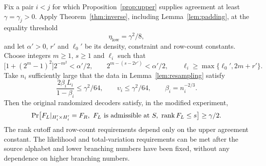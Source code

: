 \begin{proposition}\label{prop:low-rank}
Fix a pair $i<j$ for which Proposition~\ref{prop:upper} supplies
agreement at least $\gamma=\gamma_j>0$.  Apply
Theorem~\ref{thm:inverse}, including Lemma~\ref{lem:padding}, at the
equality threshold
\[
 \eta_{\mathrm{low}}=\gamma^2/8,
\]
and let $\alpha'>0$, $r'$ and $\ell_0'$ be its density, constraint and
row-count constants.  Choose integers $m\geq1$, $s\geq1$ and $\ell_i$
such that
\begin{equation}\label{eq:lower-parameter-conditions}
 \bigl[1+(2^m-1)^2\bigr]2^{-m^2}<\alpha'/2,
 \qquad 2^{m-(s-2r')}<\alpha'/2,
 \qquad \ell_i\geq\max\{\ell_0',2m+r'\}.
\end{equation}
Take $n_i$ sufficiently large that the data in
Lemma~\ref{lem:resampling} satisfy
\begin{equation}\label{eq:lower-error-conditions}
 \frac{2\beta_iL_i}{1-\beta_i}\leq\gamma^2/64,
 \qquad \upsilon_i\leq\gamma^2/64,
 \qquad \beta_i=n_i^{-2/3}.
\end{equation}
Then the original randomized decoders satisfy, in the modified
experiment,
\begin{equation}\label{eq:lower-low-rank-mass}
 \Pr\bigl[F_L|_{H_i'\times H_i'}=F_R,
       \ F_L\text{ is admissible at }S,
       \ \operatorname{rank} F_L\leq s\bigr]\geq\gamma/2.
\end{equation}
The rank cutoff and row-count requirements depend only on the upper
agreement constant.  The likelihood and total-variation requirements
can be met after the source alphabet and lower branching numbers have
been fixed, without any dependence on higher branching numbers.
\end{proposition}

